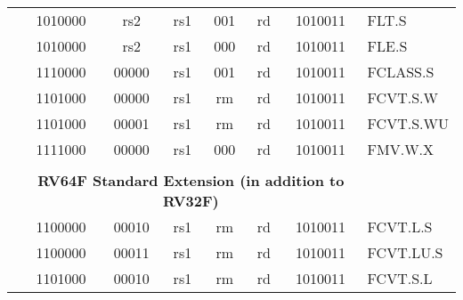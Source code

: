 \begin{table}[p]
\begin{small}
\begin{center}
\begin{tabular}{p{0in}p{0.4in}p{0.05in}p{0.05in}p{0.05in}p{0.05in}p{0.4in}p{0.6in}p{0.4in}p{0.6in}p{0.7in}l}
&
\multicolumn{4}{|c|}{1010000} &
\multicolumn{2}{c|}{rs2} &
\multicolumn{1}{c|}{rs1} &
\multicolumn{1}{c|}{001} &
\multicolumn{1}{c|}{rd} &
\multicolumn{1}{c|}{1010011} & FLT.S \\
\cline{2-11}
  

&
\multicolumn{4}{|c|}{1010000} &
\multicolumn{2}{c|}{rs2} &
\multicolumn{1}{c|}{rs1} &
\multicolumn{1}{c|}{000} &
\multicolumn{1}{c|}{rd} &
\multicolumn{1}{c|}{1010011} & FLE.S \\
\cline{2-11}
  

&
\multicolumn{4}{|c|}{1110000} &
\multicolumn{2}{c|}{00000} &
\multicolumn{1}{c|}{rs1} &
\multicolumn{1}{c|}{001} &
\multicolumn{1}{c|}{rd} &
\multicolumn{1}{c|}{1010011} & FCLASS.S \\
\cline{2-11}
  

&
\multicolumn{4}{|c|}{1101000} &
\multicolumn{2}{c|}{00000} &
\multicolumn{1}{c|}{rs1} &
\multicolumn{1}{c|}{rm} &
\multicolumn{1}{c|}{rd} &
\multicolumn{1}{c|}{1010011} & FCVT.S.W \\
\cline{2-11}
  

&
\multicolumn{4}{|c|}{1101000} &
\multicolumn{2}{c|}{00001} &
\multicolumn{1}{c|}{rs1} &
\multicolumn{1}{c|}{rm} &
\multicolumn{1}{c|}{rd} &
\multicolumn{1}{c|}{1010011} & FCVT.S.WU \\
\cline{2-11}
  

&
\multicolumn{4}{|c|}{1111000} &
\multicolumn{2}{c|}{00000} &
\multicolumn{1}{c|}{rs1} &
\multicolumn{1}{c|}{000} &
\multicolumn{1}{c|}{rd} &
\multicolumn{1}{c|}{1010011} & FMV.W.X \\
\cline{2-11}
  

&
\multicolumn{10}{c}{} & \\
&
\multicolumn{10}{c}{\bf RV64F Standard Extension (in addition to RV32F)} & \\
\cline{2-11}
  

&
\multicolumn{4}{|c|}{1100000} &
\multicolumn{2}{c|}{00010} &
\multicolumn{1}{c|}{rs1} &
\multicolumn{1}{c|}{rm} &
\multicolumn{1}{c|}{rd} &
\multicolumn{1}{c|}{1010011} & FCVT.L.S \\
\cline{2-11}
  

&
\multicolumn{4}{|c|}{1100000} &
\multicolumn{2}{c|}{00011} &
\multicolumn{1}{c|}{rs1} &
\multicolumn{1}{c|}{rm} &
\multicolumn{1}{c|}{rd} &
\multicolumn{1}{c|}{1010011} & FCVT.LU.S \\
\cline{2-11}
  

&
\multicolumn{4}{|c|}{1101000} &
\multicolumn{2}{c|}{00010} &
\multicolumn{1}{c|}{rs1} &
\multicolumn{1}{c|}{rm} &
\multicolumn{1}{c|}{rd} &
\multicolumn{1}{c|}{1010011} & FCVT.S.L \\
\cline{2-11}
  


\end{tabular}
\end{center}
\end{small}
\end{table}
